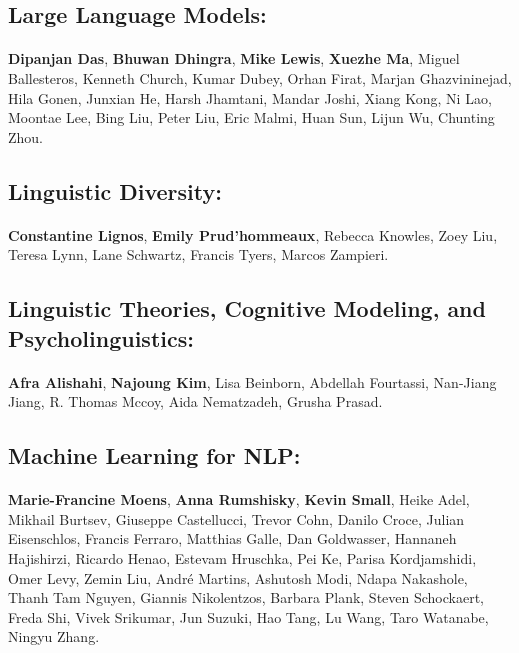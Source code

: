 \subsection*{Large Language Models:}
\paragraph{}\textbf{Dipanjan Das}, \textbf{Bhuwan Dhingra}, \textbf{Mike Lewis}, \textbf{Xuezhe Ma}, Miguel Ballesteros, Kenneth Church, Kumar Dubey, Orhan Firat, Marjan Ghazvininejad, Hila Gonen, Junxian He, Harsh Jhamtani, Mandar Joshi, Xiang Kong, Ni Lao, Moontae Lee, Bing Liu, Peter Liu, Eric Malmi, Huan Sun, Lijun Wu, Chunting Zhou.
\subsection*{Linguistic Diversity:}
\paragraph{}\textbf{Constantine Lignos}, \textbf{Emily Prud'hommeaux}, Rebecca Knowles, Zoey Liu, Teresa Lynn, Lane Schwartz, Francis Tyers, Marcos Zampieri.
\subsection*{Linguistic Theories, Cognitive Modeling, and Psycholinguistics:}
\paragraph{}\textbf{Afra Alishahi}, \textbf{Najoung Kim}, Lisa Beinborn, Abdellah Fourtassi, Nan-Jiang Jiang, R. Thomas Mccoy, Aida Nematzadeh, Grusha Prasad.
\subsection*{Machine Learning for NLP:}
\paragraph{}\textbf{Marie-Francine Moens}, \textbf{Anna Rumshisky}, \textbf{Kevin Small}, Heike Adel, Mikhail Burtsev, Giuseppe Castellucci, Trevor Cohn, Danilo Croce, Julian Eisenschlos, Francis Ferraro, Matthias Galle, Dan Goldwasser, Hannaneh Hajishirzi, Ricardo Henao, Estevam Hruschka, Pei Ke, Parisa Kordjamshidi, Omer Levy, Zemin Liu, André Martins, Ashutosh Modi, Ndapa Nakashole, Thanh Tam Nguyen, Giannis Nikolentzos, Barbara Plank, Steven Schockaert, Freda Shi, Vivek Srikumar, Jun Suzuki, Hao Tang, Lu Wang, Taro Watanabe, Ningyu Zhang.
